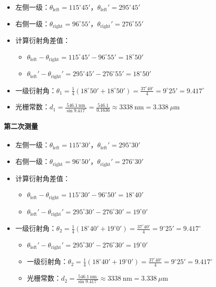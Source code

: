 \documentclass[11pt]{article}
\begin{document}
\begin{itemize}[itemsep=0.3ex]
\item 左侧一级：\(\theta_{\text{left}} = 115^\circ45'\)，\(\theta_{\text{left}}' = 295^\circ45'\)
\item 右侧一级：\(\theta_{\text{right}} = 96^\circ55'\)，\(\theta_{\text{right}}' = 276^\circ55'\)
\item 计算衍射角差值：
  \begin{itemize}
  \item \(\theta_{\text{left}} - \theta_{\text{right}} = 115^\circ45' - 96^\circ55' = 18^\circ50'\)
  \item \(\theta_{\text{left}}' - \theta_{\text{right}}' = 295^\circ45' - 276^\circ55' = 18^\circ50'\)
  \end{itemize}
\item 一级衍射角：\(\theta_1 = \frac{1}{4}(18^\circ50' + 18^\circ50') = \frac{37^\circ40'}{4} = 9^\circ25' = 9.417^\circ\)
\item 光栅常数：\(d_1 = \frac{546.1\ \text{nm}}{\sin 9.417^\circ} = \frac{546.1}{0.1636} \approx 3338\ \text{nm} = 3.338\ \mu\text{m}\)
\end{itemize}

\paragraph{第二次测量}

\begin{itemize}[itemsep=0.3ex]
\item 左侧一级：\(\theta_{\text{left}} = 115^\circ30'\)，\(\theta_{\text{left}}' = 295^\circ30'\)
\item 右侧一级：\(\theta_{\text{right}} = 96^\circ50'\)，\(\theta_{\text{right}}' = 276^\circ30'\)
\item 计算衍射角差值：
  \begin{itemize}
  \item \(\theta_{\text{left}} - \theta_{\text{right}} = 115^\circ30' - 96^\circ50' = 18^\circ40'\)
  \item \(\theta_{\text{left}}' - \theta_{\text{right}}' = 295^\circ30' - 276^\circ30' = 19^\circ0'\)
  \end{itemize}

\item 一级衍射角：\(\theta_2 = \frac{1}{4}(18^\circ40' + 19^\circ0') = \frac{37^\circ40'}{4} = 9^\circ25' = 9.417^\circ\)
  \begin{itemize}
  \item \(\theta_{\text{left}}' - \theta_{\text{right}}' = 295^\circ30' - 276^\circ30' = 19^\circ0'\)
  \item 一级衍射角：\(\theta_2 = \frac{1}{4}(18^\circ40' + 19^\circ0') = \frac{37^\circ40'}{4} = 9^\circ25' = 9.417^\circ\)
  \item 光栅常数：\(d_2 = \frac{546.1\ \text{nm}}{\sin 9.417^\circ} \approx 3338\ \text{nm} = 3.338\ \mu\text{m}\)
  \end{itemize}
\end{itemize}
\end{document}
